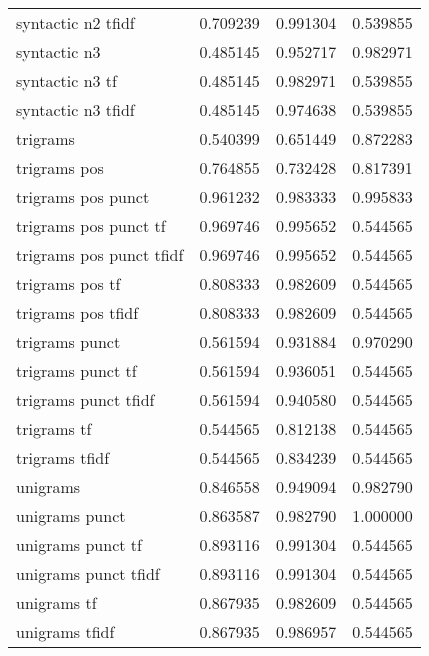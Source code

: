 \begin{tabular}{lrrr}
syntactic n2 tfidf         &  0.709239 &       0.991304 &             0.539855 \\
syntactic n3               &  0.485145 &       0.952717 &             0.982971 \\
syntactic n3 tf            &  0.485145 &       0.982971 &             0.539855 \\
syntactic n3 tfidf         &  0.485145 &       0.974638 &             0.539855 \\
trigrams                   &  0.540399 &       0.651449 &             0.872283 \\
trigrams pos               &  0.764855 &       0.732428 &             0.817391 \\
trigrams pos punct         &  0.961232 &       0.983333 &             0.995833 \\
trigrams pos punct tf      &  0.969746 &       0.995652 &             0.544565 \\
trigrams pos punct tfidf   &  0.969746 &       0.995652 &             0.544565 \\
trigrams pos tf            &  0.808333 &       0.982609 &             0.544565 \\
trigrams pos tfidf         &  0.808333 &       0.982609 &             0.544565 \\
trigrams punct             &  0.561594 &       0.931884 &             0.970290 \\
trigrams punct tf          &  0.561594 &       0.936051 &             0.544565 \\
trigrams punct tfidf       &  0.561594 &       0.940580 &             0.544565 \\
trigrams tf                &  0.544565 &       0.812138 &             0.544565 \\
trigrams tfidf             &  0.544565 &       0.834239 &             0.544565 \\
unigrams                   &  0.846558 &       0.949094 &             0.982790 \\
unigrams punct             &  0.863587 &       0.982790 &             1.000000 \\
unigrams punct tf          &  0.893116 &       0.991304 &             0.544565 \\
unigrams punct tfidf       &  0.893116 &       0.991304 &             0.544565 \\
unigrams tf                &  0.867935 &       0.982609 &             0.544565 \\
unigrams tfidf             &  0.867935 &       0.986957 &             0.544565 \\
\bottomrule
\end{tabular}
